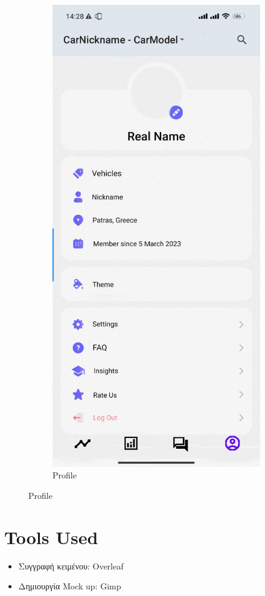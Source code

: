 \documentclass[11pt]{scrartcl} %
\begin{document}
\begin{figure}[!htb]
\begin{subfigure}{.5\textwidth}
  \includegraphics[width=.6\linewidth]{assets/profile_mock_up.jpg}
  \caption{Profile}
  \label{fig:sfig4}
\end{subfigure}
\label{fig:fig}
\end{figure}

\section*{Tools Used}
\begin{itemize}
    \item Συγγραφή κειμένου: Overleaf
    \item Δημιουργία Mock up: Gimp
\end{itemize}


\end{document}
